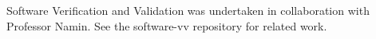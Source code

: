 \noindent Software Verification and Validation was undertaken in collaboration with Professor Namin. See the software-vv repository for related work.

\vspace{1em}